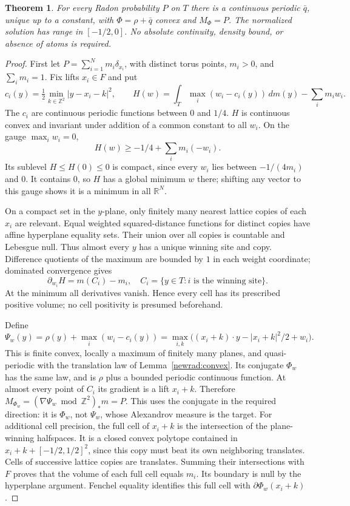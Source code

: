 \documentclass[11pt]{article}
\newtheorem{theorem}{Theorem}
\begin{document}
\begin{theorem}\label{newrad:realexist}
For every Radon probability $P$ on $T$ there is a continuous periodic
$\bar q$, unique up to a constant, with $\Phi=\rho+\bar q$ convex
and $M_\Phi=P$. The normalized solution has range in $[-1/2,0]$.
No absolute continuity, density bound, or absence of atoms is required.
\end{theorem}
\begin{proof}
First let $P=\sum_{i=1}^N m_i\delta_{x_i}$, with distinct torus
points, $m_i>0$, and $\sum_i m_i=1$. Fix lifts $x_i\in F$ and put
\[
 c_i(y)=\tfrac12\min_{k\in\mathbb Z^2}|y-x_i-k|^2,
 \qquad H(w)=\int_T\max_i(w_i-c_i(y))\,dm(y)-\sum_i m_iw_i.
\]
The $c_i$ are continuous periodic functions between $0$ and $1/4$.
$H$ is continuous convex and invariant under addition of a common
constant to all $w_i$. On the gauge $\max_i w_i=0$,
\[
 H(w)\ge-1/4+\sum_i m_i(-w_i).
\]
Its sublevel $H\le H(0)\le0$ is compact, since every $w_i$ lies
between $-1/(4m_i)$ and $0$. It contains $0$, so $H$ has a global
minimum $w$ there; shifting any vector to this gauge shows it is a
minimum in all $\mathbb R^N$.

On a compact set in the $y$-plane, only finitely many nearest lattice
copies of each $x_i$ are relevant. Equal weighted squared-distance
functions for distinct copies have affine hyperplane equality sets.
Their union over all copies is countable and Lebesgue null. Thus
almost every $y$ has a unique winning site and copy. Difference
quotients of the maximum are bounded by $1$ in each weight coordinate;
dominated convergence gives
\[
 \partial_{w_i}H= m(C_i)-m_i,
 \quad C_i=\{y\in T:i\text{ is the winning site}\}.
\]
At the minimum all derivatives vanish. Hence every cell has its
prescribed positive volume; no cell positivity is presumed beforehand.

Define
\[
 \Psi_w(y)=\rho(y)+\max_i(w_i-c_i(y))
 =\max_{i,k}\big((x_i+k)\cdot y-|x_i+k|^2/2+w_i\big).
\]
This is finite convex, locally a maximum of finitely many planes, and
quasi-periodic with the translation law of Lemma~\ref{newrad:convex}.
Its conjugate $\Phi_w$ has the same law, and is $\rho$ plus a bounded
periodic continuous function. At almost every point of $C_i$ its
gradient is a lift $x_i+k$. Therefore
$M_{\Phi_w}=(\nabla\Psi_w\bmod\mathbb Z^2)_*m=P$.
This uses the conjugate in the required direction: it is $\Phi_w$,
not $\Psi_w$, whose Alexandrov measure is the target.
For additional cell precision, the full cell of $x_i+k$ is the
intersection of the plane-winning halfspaces. It is a closed convex
polytope contained in $x_i+k+[-1/2,1/2]^2$, since this copy must beat
its own neighboring translates. Cells of successive lattice copies
are translates. Summing their intersections with $F$ proves that the
volume of each full cell equals $m_i$. Its boundary is null by the
hyperplane argument. Fenchel equality identifies this full cell with
$\partial\Phi_w(x_i+k)$.


\end{proof}
\end{document}
